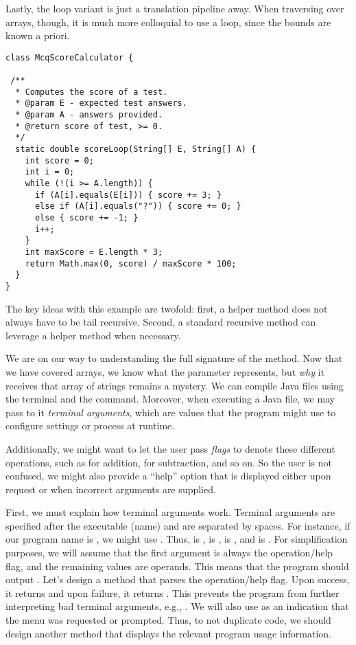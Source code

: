 Lastly, the loop variant is just a translation pipeline away. 
When traversing over arrays, though, it is much more colloquial to use a  loop, since the bounds are known a priori.

\begin{lstlisting}[language=MyJava]
class McqScoreCalculator {

 /**
  * Computes the score of a test.
  * @param E - expected test answers.
  * @param A - answers provided.
  * @return score of test, >= 0.
  */
  static double scoreLoop(String[] E, String[] A) {
    int score = 0;
    int i = 0;
    while (!(i >= A.length)) {
      if (A[i].equals(E[i])) { score += 3; } 
      else if (A[i].equals("?")) { score += 0; } 
      else { score += -1; }
      i++;
    }
    int maxScore = E.length * 3;
    return Math.max(0, score) / maxScore * 100;
  }
}
\end{lstlisting}

The key ideas with this example are twofold: first, a helper method does not always have to be tail recursive. 
Second, a standard recursive method can leverage a helper method when necessary.

We are on our way to understanding the full signature of the  method. 
Now that we have covered arrays, we know what the  parameter represents, but \emph{why} it receives that array of strings remains a mystery. 
We can compile Java files using the terminal and the  command. 
Moreover, when executing a Java file, we may pass to it \emph{terminal arguments}, which are values that the program might use to configure settings or process at runtime.

Additionally, we might want to let the user pass \emph{flags} to denote these different operations, such as  for addition,  for subtraction, and so on. 
So the user is not confused, we might also provide a ``help'' option that is displayed either upon request or when incorrect arguments are supplied.

First, we must explain how terminal arguments work. 
Terminal arguments are specified after the executable (name) and are separated by spaces. 
For instance, if our program name is , we might use . 
Thus,  is ,  is ,  is , and  is . 
For simplification purposes, we will assume that the first argument is always the operation/help flag, and the remaining values are operands. 
This means that the program should output . 
Let's design a method that parses the operation/help flag. 
Upon success, it returns  and upon failure, it returns . 
This prevents the program from further interpreting bad terminal arguments, e.g., . 
We will also use  as an indication that the  menu was requested or prompted. 
Thus, to not duplicate code, we should design another method that displays the relevant program usage information.

